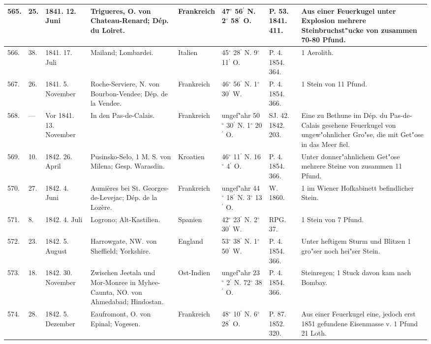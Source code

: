 \documentclass[a4paper, 8pt, oneside, polutonikogreek, german]{article}
\begin{document}
\begin{center}
\begin{longtable}{| p{5mm} | p{3mm} | p{15mm} | p{25mm} | p{20mm} | p{14mm} | p{17mm} | p{24mm} |}
        565. & 25. & 1841. 12. Juni & Trigueres, O. von Chateau-Renard; Dép. du Loiret. & Frankreich & 47$^\circ$ 56$^\prime$ N. 2$^\circ$ 58$^\prime$ O. & P. 53. 1841. 411. & Aus einer Feuerkugel unter Explosion mehrere Steinbruchst"ucke von zusammen 70-80 Pfund. \\ \hline
        566. & 38. & 1841. 17. Juli & Mailand; Lombardei. & Italien & 45$^\circ$ 28$^\prime$ N. 9$^\circ$ 11$^\prime$ O. & P. 4. 1854. 364. & 1 Aerolith. \\ \hline
        567. & 26. & 1841. 5. November & Roche-Serviere, N. von Bourbon-Vendee; Dép. de la Vendee. & Frankreich & 46$^\circ$ 56$^\prime$ N. 1$^\circ$ 30$^\prime$ W. & P. 4. 1854. 366. & 1 Stein von 11 Pfund. \\ \hline
        568. & --- & Vor 1841. 13. November & In den Pas-de-Calais. & Frankreich & ungef"ahr 50$^\circ$ 30$^\prime$ N. 1$^\circ$ 20$^\prime$ O. & SJ. 42. 1842. 203. & Eine zu Bethune im Dép. du Pas-de-Calais gesehene Feuerkugel von ungew"ohnlicher Gro"se, die mit Get"ose in das Meer fiel. \\ \hline
        569. & 10. & 1842. 26. April & Pusinsko-Selo, 1 M. S. von Milena; Gesp. Warasdin. & Kroatien & 46$^\circ$ 11$^\prime$ N. 16$^\circ$ 4$^\prime$ O. & P. 4. 1854. 366. & Unter donner"ahnlichem Get"ose mehrere Steine von zusammen 11 Pfund. \\ \hline
        570. & 27. & 1842. 4. Juni & Aumières bei St. Georges-de-Levejac; Dép. de la Lozère. & Frankreich & ungef"ahr 44$^\circ$ 18$^\prime$ N. 3$^\circ$ 13$^\prime$ O. & W. 1860. & 1 im Wiener Hofkabinett befindlicher Stein. \\ \hline
        571. & 8. & 1842. 4. Juli & Logrono; Alt-Kastilien. & Spanien & 42$^\circ$ 23$^\prime$ N. 2$^\circ$ 30$^\prime$ W. & RPG. 37. & 1 Stein von 7 Pfund. \\ \hline
        572. & 23. & 1842. 5. August & Harrowgate, NW. von Sheffield; Yorkshire. & England & 53$^\circ$ 38$^\prime$ N. 1$^\circ$ 50$^\prime$ W. & P. 4. 1854. 366. & Unter heftigem Sturm und Blitzen 1 gro"ser noch hei"ser Stein. \\ \hline
        573. & 18. & 1842. 30. November & Zwischen Jeetala und Mor-Monree in Myhee-Caunta, NO. von Ahmedabad; Hindostan. & Ost-Indien & ungef"ahr 23$^\circ$ 2$^\prime$ N. 72$^\circ$ 38$^\prime$ O. & P. 4. 1854. 366. & Steinregen; 1 Stuck davon kam nach Bombay. \\ \hline
        574. & 28. & 1842. 5. Dezember & Eaufromont, O. von Epinal; Vogesen. & Frankreich & 48$^\circ$ 10$^\prime$ N. 6$^\circ$ 28$^\prime$ O. & P. 87. 1852. 320. & Aus einer Feuerkugel eine, jedoch erst 1851 gefundene Eisenmasse v. 1 Pfund 21 Loth. \\ \hline

\end{longtable}
\end{center}
\end{document}
